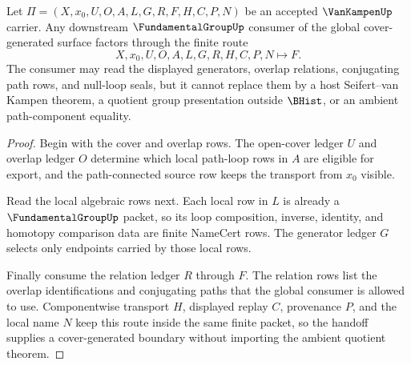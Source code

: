 \begin{theorem}
\label{thm:van-kampen-cover-generator-handoff}
Let $\Pi=(X,x_0,U,O,A,L,G,R,F,H,C,P,N)$ be an accepted $\VanKampenUp$ carrier. Any downstream $\FundamentalGroupUp$ consumer of the global cover-generated surface factors through the finite route
$$
X,x_0,U,O,A,L,G,R,H,C,P,N \longmapsto F .
$$
The consumer may read the displayed generators, overlap relations, conjugating path rows, and null-loop seals, but it cannot replace them by a host Seifert--van Kampen theorem, a quotient group presentation outside $\BHist$, or an ambient path-component equality.
\end{theorem}
\begin{proof}
Begin with the cover and overlap rows. The open-cover ledger $U$ and overlap ledger $O$ determine which local path-loop rows in $A$ are eligible for export, and the path-connected source row keeps the transport from $x_0$ visible.

Read the local algebraic rows next. Each local row in $L$ is already a $\FundamentalGroupUp$ packet, so its loop composition, inverse, identity, and homotopy comparison data are finite NameCert rows. The generator ledger $G$ selects only endpoints carried by those local rows.

Finally consume the relation ledger $R$ through $F$. The relation rows list the overlap identifications and conjugating paths that the global consumer is allowed to use. Componentwise transport $H$, displayed replay $C$, provenance $P$, and the local name $N$ keep this route inside the same finite packet, so the handoff supplies a cover-generated boundary without importing the ambient quotient theorem.
\end{proof}


\begin{closurestatus}{\VanKampenUp}
  \theoryclosure{\seedClosure}
  \formalstatus{\unformalizedV}
\end{closurestatus}
